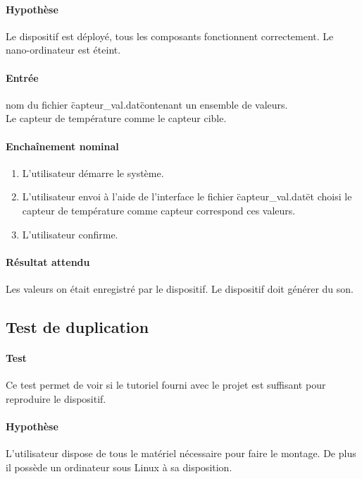 \documentclass[a4paper, titlepage, oneside, 12pt]{article}%
\begin{document}
\paragraph{Hypothèse\\}
Le dispositif est déployé, tous les composants fonctionnent correctement.
Le nano-ordinateur est éteint.

\paragraph{Entrée\\}
nom du fichier \"capteur\_val.dat\" contenant un ensemble de valeurs.\\
Le capteur de température comme le capteur cible.

\paragraph{Enchaînement nominal}
\begin {enumerate}
\item L'utilisateur démarre le système.
\item L'utilisateur envoi à l'aide de l'interface le fichier \"capteur\_val.dat\" et choisi le capteur de température comme capteur correspond ces valeurs.
\item L'utilisateur confirme.
\end{enumerate}

\paragraph{Résultat attendu\\}
Les valeurs on était enregistré par le dispositif. Le dispositif doit générer du son.


\subsection{Test de duplication}

\paragraph{Test\\}
Ce test permet de voir si le tutoriel fourni avec le projet est suffisant pour reproduire le dispositif.
\paragraph{Hypothèse\\}
L'utilisateur dispose de tous le matériel nécessaire pour faire le montage.
De plus il possède un ordinateur sous Linux à sa disposition.
\end{document}
